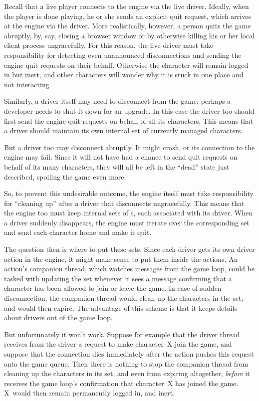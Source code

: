 Recall that a live player connects to the engine via the live driver.
Ideally, when the player is done playing, he or she sends an explicit quit
request, which arrives at the engine via the driver.
More realistically, however, a person quits the game abruptly, by, say,
closing a browser window or by otherwise killing his or her local
client process ungracefully.
For this reason, the live driver must take responsibility for detecting even
unannounced disconnections and sending the engine quit requests on their behalf.
Otherwise the character will remain logged in but inert, and other characters
will wonder why it is stuck in one place and not interacting.

Similarly, a driver itself may need to disconnect from the game;
perhaps a developer needs to shut it down for an upgrade.
In this case the driver too should first send the engine quit requests on
behalf of all its characters.
This means that a driver should maintain its own internal set
of currently managed characters.

But a driver too may disconnect abruptly.
It might crash, or its connection to the engine may fail.
Since it will not have had a chance to send quit requests on behalf of its
many characters, they will all be left in the ``dead'' state just described,
spoiling the game even more.

So, to prevent this undesirable outcome, the engine itself must take
responsibility for
``cleaning up'' after a driver that disconnects ungracefully.
This means that the engine too must keep internal sets of \cid s, each
associated with its driver.
When a driver suddenly disappears, the engine must iterate over the
corresponding set and send each character home and make it quit.

The question then is where to put these sets.
Since each driver gets its own driver action in the engine, it might make
sense to put them inside the actions.
An action's companion thread, which watches messages from
the game loop, could be tasked with updating the set whenever it sees a
message confirming that a character has been allowed to join or leave
the game.
In case of sudden disconnection, the companion thread would clean up the
characters in the set, and would then expire.
The advantage of this scheme is that it keeps details about drivers
out of the game loop.

But unfortunately it won't work.
Suppose for example that the driver thread receives from the driver a request
to make character~X join the game, and suppose that the connection dies
immediately after the action pushes this request onto the game queue.
Then there is nothing to stop the companion thread from cleaning up the
characters in its set, and even from expiring altogether, {\em before} it
receives the game loop's confirmation that character~X has joined the game.
X~would then remain permanently logged in, and inert.

